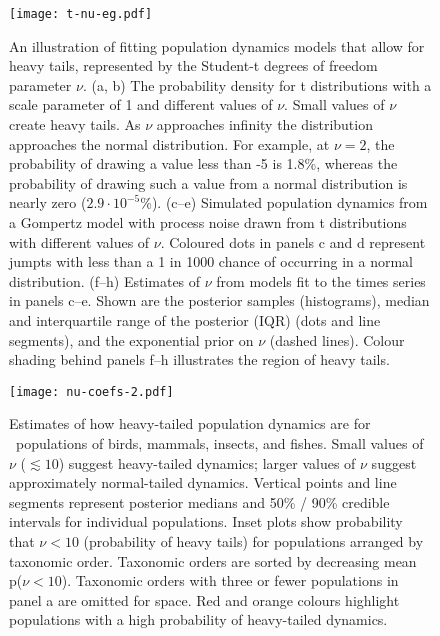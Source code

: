 \begin{figure}[htbp]
\begin{center}
\texttt{[image: t-nu-eg.pdf]}
\caption{An illustration of fitting population dynamics models that allow for heavy tails, represented by the Student-t degrees of freedom parameter $\nu$.
  (a, b) The probability density for t distributions with a scale parameter of 1 and different values of $\nu$.
  Small values of $\nu$ create heavy tails.
  As $\nu$ approaches infinity the distribution approaches the normal distribution.
  For example, at $\nu = 2$, the probability of drawing a value less than -5 is 1.8\%, whereas the probability of drawing such a value from a normal distribution is nearly zero ($2.9\cdot10^{-5}$\%).
  (c--e) Simulated population dynamics from a Gompertz model with process noise drawn from t distributions with different values of $\nu$.
  Coloured dots in panels c and d represent jumpts with less than a 1 in 1000 chance of occurring in a normal distribution.
  (f--h) Estimates of $\nu$ from models fit to the times series in panels c--e.
  Shown are the posterior samples (histograms), median and interquartile range of the posterior (IQR) (dots and line segments), and the exponential prior on $\nu$ (dashed lines).
  Colour shading behind panels f--h illustrates the region of heavy tails.}
\label{fig:didactic}
\end{center}
\end{figure}

\clearpage

\begin{figure}[htbp]
\begin{center}
\texttt{[image: nu-coefs-2.pdf]}
\caption{
Estimates of how heavy-tailed population dynamics are for \nuCoefPopN\ populations of birds, mammals, insects, and fishes.
Small values of $\nu$ ($\lesssim 10$) suggest heavy-tailed dynamics; larger values of $\nu$ suggest approximately normal-tailed dynamics.
Vertical points and line segments represent posterior medians and 50\% / 90\% credible intervals for individual populations.
Inset plots show probability that $\nu < 10$ (probability of heavy tails) for populations arranged by taxonomic order.
Taxonomic orders are sorted by decreasing mean p($\nu < 10$).
Taxonomic orders with three or fewer populations in panel a are omitted for space.
Red and orange colours highlight populations with a high probability of heavy-tailed dynamics.
}
\label{fig:nu-coefs}
\end{center}
\end{figure}

